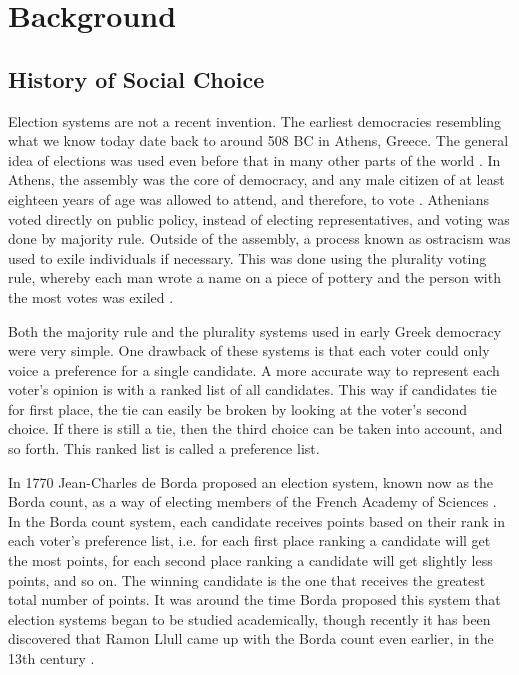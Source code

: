 
\chapter{Background}

\section{History of Social Choice}

	Election systems are not a recent invention. The earliest democracies resembling what we know today date back to around 508 BC in Athens, Greece. The general idea of elections was used even before that in many other parts of the world \cite{democracybritannica}. In Athens, the assembly was the core of democracy, and any male citizen of at least eighteen years of age was allowed to attend, and therefore, to vote \cite{heinemann1952}. Athenians voted directly on public policy, instead of electing representatives, and voting was done by majority rule. Outside of the assembly, a process known as ostracism was used to exile individuals if necessary. This was done using the plurality voting rule, whereby each man wrote a name on a piece of pottery and the person with the most votes was exiled \cite{oturnbull}.

	Both the majority rule and the plurality systems used in early Greek democracy were very simple. One drawback of these systems is that each voter could only voice a preference for a single candidate. A more accurate way to represent each voter's opinion is with a ranked list of all candidates. This way if candidates tie for first place, the tie can easily be broken by looking at the voter's second choice. If there is still a tie, then the third choice can be taken into account, and so forth. This ranked list is called a preference list.

	In 1770 Jean-Charles de Borda proposed an election system, known now as the Borda count, as a way of electing members of the French Academy of Sciences \cite{borda1781mémoire}. In the Borda count system, each candidate receives points based on their rank in each voter's preference list, i.e. for each first place ranking a candidate will get the most points, for each second place ranking a candidate will get slightly less points, and so on. The winning candidate is the one that receives the greatest total number of points. It was around the time Borda proposed this system that election systems began to be studied academically, though recently it has been discovered that Ramon Llull came up with the Borda count even earlier, in the 13th century \cite{hägele2001llull}.

